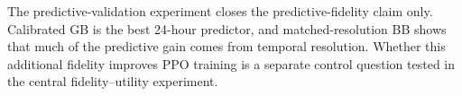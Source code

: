 The predictive-validation experiment closes the predictive-fidelity claim only. Calibrated GB is the best 24-hour predictor, and matched-resolution BB shows that much of the predictive gain comes from temporal resolution. Whether this additional fidelity improves PPO training is a separate control question tested in the central fidelity--utility experiment.

